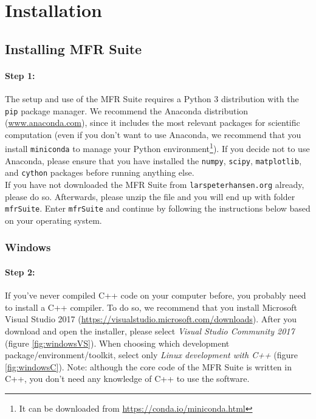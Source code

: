 \documentclass[12pt]{article}
\newcommand{\softwareShortName}{MFR Suite\xspace}
\newcommand{\folderName}{\texttt{mfrSuite}\xspace}
\newcommand{\linkToDownload}{\texttt{larspeterhansen.org}\xspace}
\begin{document}
\newpage

\section{Installation}

\subsection{Installing \softwareShortName }
\paragraph{Step 1:} The setup and use of the \softwareShortName requires a Python 3 distribution with the \texttt{pip}
package manager. We recommend the Anaconda distribution (\href{https://www.anaconda.com/}{www.anaconda.com}), since it includes
the most relevant packages for scientific computation (even if you don't want to use Anaconda, we recommend that you install \texttt{miniconda} to manage your Python environment\footnote{It can be downloaded from \href{https://conda.io/miniconda.html}{https://conda.io/miniconda.html}}). If you decide not to use Anaconda, please ensure that you have installed the \texttt{numpy}, \texttt{scipy}, \texttt{matplotlib}, and \texttt{cython} packages before running anything else. \\

If you have not downloaded the \softwareShortName from \linkToDownload already, please do so. Afterwards, please unzip the file and you will end up with folder \folderName. Enter \folderName and continue by following the instructions below based on your operating system.

\subsubsection{Windows}
\paragraph{Step 2:}  If you've never compiled C++ code on your computer before, you probably need to install a C++ compiler. To do so, we recommend that you install Microsoft Visual Studio 2017 (\href{https://visualstudio.microsoft.com/downloads}{https://visualstudio.microsoft.com/downloads}). After you download and open the installer, please select \textit{Visual Studio Community 2017} (figure \ref{fig:windowsVS}). When choosing which development package/environment/toolkit, select only \textit{Linux development with C++} (figure \ref{fig:windowsC}). Note: although the core code of the \softwareShortName is written in C++, you don't need any knowledge of C++ to use the software.
\end{document}
